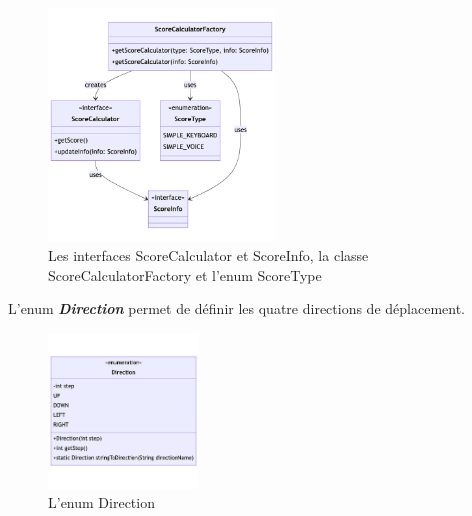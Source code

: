 \begin{figure}[H]
    \centering
    \includegraphics[width=6cm]{ressources/Implementation/Labyrinthe/Modele/ScoreCalculator.png}
    \caption{Les interfaces ScoreCalculator et ScoreInfo, la classe ScoreCalculatorFactory et l'enum ScoreType}
    \label{fig:ScoreCalculatorAndElse}
\end{figure}

L'enum \textbf{\textit{Direction}} permet de définir les quatre directions de
déplacement.
\begin{figure}[H]
    \centering
    \includegraphics[width=4cm]{ressources/Implementation/Labyrinthe/Modele/Direction.png}
    \caption{L'enum Direction}
    \label{fig:Direction}
\end{figure}